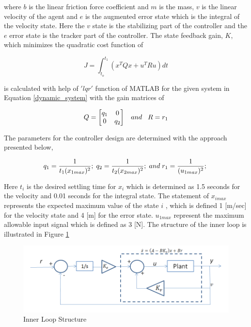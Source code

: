 where $b$ is the linear friction force coefficient and $m$ is the mass, $v$  is the linear velocity of the agent and $e$ is the augmented error state which is the integral of the velocity state. Here the $v$ state is the stabilizing part of the controller and the $e$ error state is the tracker part of the controller. The state feedback gain, $K$, which minimizes the quadratic cost function of

\begin{equation}
J = \int_{t_o}^{t_1}(x^TQx + u^TRu) dt
\end{equation}

is calculated with help of $'lqr'$ function of MATLAB for the given system in Equation \ref{dynamic_system} with the gain matrices of 

\begin{equation}
Q = \begin{bmatrix}
q_1 & 0 \\ 0 & q_2
\end{bmatrix}
\hspace{0.3cm} and
\hspace{0.3cm}
R = r_1
\end{equation}

The parameters for the controller design are determined with the approach presented below,

\begin{equation}
q_1 = \frac{1}{t_1 (x_{1max})^2}; \hspace{0.1cm}
q_2 = \frac{1}{t_2 (x_{2max})^2}; \hspace{0.1cm} and \hspace{0.1cm}
r_1 = \frac{1}{ (u_{1max})^2}; \hspace{0.1cm}
\end{equation}

Here $t_i$  is the desired settling time for $x_i$ which is determined as 1.5 seconds for the velocity and 0.01 seconds for the integral state. The statement of $x_{imax}$ represents the expected maximum value of the state $i$ , which is defined 1 [m/sec] for the velocity state and 4 [m] for the error state. $u_{1max}$ represent the maximum allowable input signal which is defined as 3 [N]. The structure of the inner loop is illustrated in Figure \ref{innerloopref}

\begin{figure}[H]
\caption{Inner Loop Structure} \label{innerloopref}
\centering
\includegraphics[scale = 0.50]{inner_loop}
\end{figure}

